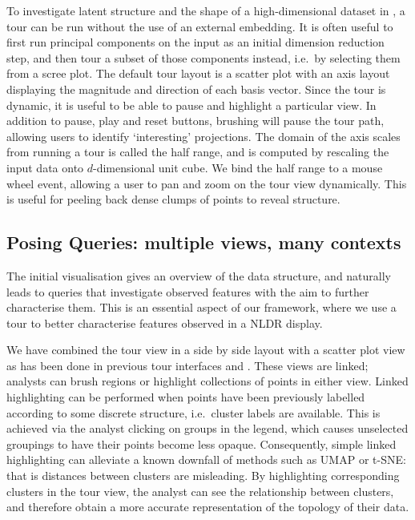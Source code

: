 \documentclass[article,notitle]{jdssv}
\begin{document}
To investigate latent structure and the shape of a high-dimensional dataset in
, a tour can be run without the use of an external embedding.
It is often useful to
first run principal components on the input as an initial dimension reduction
step, and then tour a subset of those components instead, i.e.~by selecting
them from a scree plot. The default tour layout is a scatter plot with an axis
layout displaying the magnitude and direction of each basis vector. Since the
tour is dynamic, it is useful to be able to pause and highlight a
particular view. In addition to pause, play and reset buttons, brushing will
pause the tour path, allowing users to identify `interesting' projections.
The
domain of the axis scales from running a tour is called the half range, and is
computed by rescaling the input data onto \(d\)-dimensional unit cube. We bind
the half range to a mouse wheel event, allowing a user to pan and zoom on the
tour view dynamically. This is useful for peeling back dense clumps of points
to reveal structure.

\hypertarget{posing-queries-multiple-views-many-contexts}{%
\subsection{Posing Queries: multiple views, many contexts}\label{posing-queries-multiple-views-many-contexts}}

The initial visualisation gives an overview of the data structure,
and naturally leads to queries that investigate observed features with
the aim to further characterise them. This is an essential aspect of
our framework, where we use a tour to better characterise
features observed in a NLDR display.

We have combined the tour view in a side by side layout with a scatter plot
view as has been done in previous tour interfaces  and 
\citep{Buja1986-ku, Swayne1998-uq}. These views are
linked; analysts can brush regions or highlight collections of points in either
view. Linked highlighting can be performed when points have been previously
labelled according to some discrete structure, i.e.~cluster labels are
available. This is achieved via the analyst clicking on groups in the legend,
which causes unselected groupings to have their points become less opaque.
Consequently, simple linked highlighting can alleviate a known downfall of
methods such as UMAP or t-SNE: that is distances between clusters are
misleading. By highlighting corresponding clusters in the tour view, the
analyst can see the relationship between clusters, and therefore obtain a more
accurate representation of the topology of their data.
\end{document}
